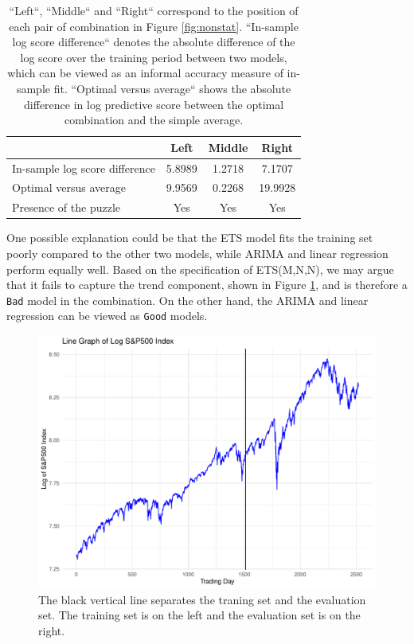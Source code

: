 \documentclass{monashthesis}
\begin{document}
\begin{table}[ht]
  \centering
    \begin{tabular}{l|ccc}
    \toprule
                                      &    Left     &   Middle    &    Right   \\
    \midrule
    In-sample log score difference    &   5.8989    &   1.2718    &   7.1707   \\
    Optimal versus average            &   9.9569    &   0.2268    &  19.9928   \\
    Presence of the puzzle            &   Yes       &   Yes       &   Yes      \\
    \bottomrule
    \end{tabular}
  \caption{``Left``, ``Middle`` and ``Right`` correspond to the position of each pair of combination in Figure \ref{fig:nonstat}. ``In-sample log score difference`` denotes the absolute difference of the log score over the training period between two models, which can be viewed as an informal accuracy measure of in-sample fit. ``Optimal versus average`` shows the absolute difference in log predictive score between the optimal combination and the simple average.}
  \label{tab:comparison1}
\end{table}

One possible explanation could be that the ETS model fits the training set poorly compared to the other two models, while ARIMA and linear regression perform equally well. Based on the specification of ETS(M,N,N), we may argue that it fails to capture the trend component, shown in Figure \ref{fig:llg}, and is therefore a \texttt{Bad} model in the combination. On the other hand, the ARIMA and linear regression can be viewed as \texttt{Good} models.

\begin{figure}[ht]
\centering
\includegraphics[scale=0.4]{figures/log_linegraph.pdf}
\caption{The black vertical line separates the traning set and the evaluation set. The training set is on the left and the evaluation set is on the right.}
\label{fig:llg}
\end{figure}
\end{document}
